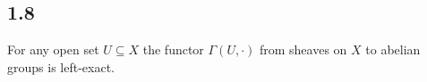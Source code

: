 \subsection*{1.8}
For any open set $U \subseteq X$ the functor $\Gamma(U, \cdot)$ from sheaves on $X$ to abelian groups is left-exact.